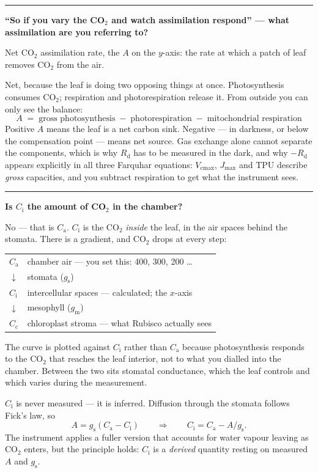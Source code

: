 \documentclass[11pt,letterpaper]{article}
\newcommand{\Vcmax}{\ensuremath{V_{\mathrm{cmax}}}}
\newcommand{\Jmax}{\ensuremath{J_{\mathrm{max}}}}
\newcommand{\Rd}{\ensuremath{R_{\mathrm{d}}}}
\newcommand{\Ci}{\ensuremath{C_{\mathrm{i}}}}
\newcommand{\Ca}{\ensuremath{C_{\mathrm{a}}}}
\newcommand{\Cc}{\ensuremath{C_{\mathrm{c}}}}
\newcommand{\question}[1]{%
  \vspace{1.5em}%
  {\noindent\color{rulegray}\rule{\textwidth}{0.4pt}\par}%
  \vspace{0.7em}%
  {\noindent\color{accent}\bfseries #1\par}%
  \vspace{0.6em}%
}
\begin{document}
\question{``So if you vary the CO$_2$ and watch assimilation respond'' --- what
assimilation are you referring to?}

Net CO$_2$ assimilation rate, the $A$ on the $y$-axis: the rate at which a patch
of leaf removes CO$_2$ from the air.

Net, because the leaf is doing two opposing things at once. Photosynthesis
consumes CO$_2$; respiration and photorespiration release it. From outside you
can only see the balance:
\[
A \;=\; \text{gross photosynthesis} \;-\; \text{photorespiration} \;-\;
\text{mitochondrial respiration}
\]
Positive $A$ means the leaf is a net carbon sink. Negative --- in darkness, or
below the compensation point --- means net source. Gas exchange alone cannot
separate the components, which is why \Rd{} has to be measured in the dark, and
why $-\Rd$ appears explicitly in all three Farquhar equations: \Vcmax{}, \Jmax{}
and TPU describe \emph{gross} capacities, and you subtract respiration to get
what the instrument sees.

\question{Is \Ci{} the amount of CO$_2$ in the chamber?}

No --- that is \Ca{}. \Ci{} is the CO$_2$ \emph{inside} the leaf, in the air
spaces behind the stomata. There is a gradient, and CO$_2$ drops at every step:

\begin{center}
\begin{tabular}{@{}ll@{}}
\toprule
\Ca{} & chamber air --- you set this: 400, 300, 200 \ldots\\
\quad$\downarrow$ & stomata ($g_{\mathrm{s}}$)\\
\Ci{} & intercellular spaces --- calculated; the $x$-axis\\
\quad$\downarrow$ & mesophyll ($g_{\mathrm{m}}$)\\
\Cc{} & chloroplast stroma --- what Rubisco actually sees\\
\bottomrule
\end{tabular}
\end{center}

The curve is plotted against \Ci{} rather than \Ca{} because photosynthesis
responds to the CO$_2$ that reaches the leaf interior, not to what you dialled
into the chamber. Between the two sits stomatal conductance, which the leaf
controls and which varies during the measurement.

\Ci{} is never measured --- it is inferred. Diffusion through the stomata
follows Fick's law, so
\[
A = g_{\mathrm{s}}(\Ca - \Ci)
\qquad\Longrightarrow\qquad
\Ci = \Ca - A/g_{\mathrm{s}}.
\]
The instrument applies a fuller version that accounts for water vapour leaving
as CO$_2$ enters, but the principle holds: \Ci{} is a \emph{derived} quantity
resting on measured $A$ and $g_{\mathrm{s}}$.
\end{document}

